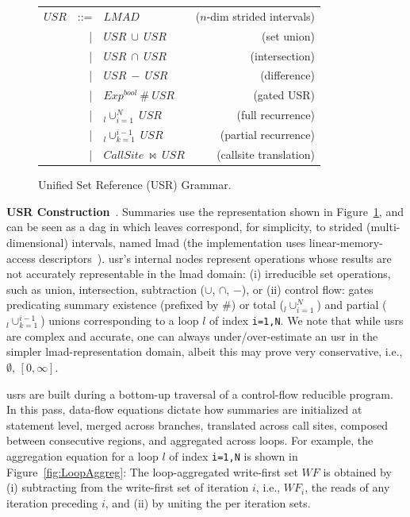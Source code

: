 \documentclass{sig-alternate}
\begin{document}
\begin{figure}[hbt]
\begin{tabular}{lclr}
$USR$ & ::= &  $LMAD$                 & ($n$-dim strided intervals)\\
      & {\tt~~}| & $USR \ \cup \ USR$ & (set union)\\
      & {\tt~~}| & $USR \ \cap \ USR$ & (intersection)\\
      & {\tt~~}| & $USR \ - \ USR$ & (difference)\\
      & {\tt~~}| & $Exp^{bool} \ \# \ USR$ & (gated USR)\\
      & {\tt~~}| & $_l\cup_{i=1}^{N} \ USR$ & (full recurrence)\\
      & {\tt~~}| & $_l\cup_{k=1}^{i-1} \ USR$ & (partial recurrence)\\
      & {\tt~~}| & $CallSite \ \bowtie \ USR$ & (callsite translation)
\end{tabular}\vspace{-2ex}
\caption{Unified Set Reference (USR) Grammar.}
\label{fig:USRgrammar}
\end{figure}

{\bf USR Construction}~\cite{HybAn}.
%
Summaries use the representation shown in Figure~\ref{fig:USRgrammar},
and can be seen as a {\sc dag} in which leaves correspond,
for simplicity, to strided (multi-dimensional) intervals, 
named {\sc lmad} (the implementation uses linear-memory-access 
descriptors~\cite{LMAD}).
{\sc usr}'s internal nodes represent operations whose results are not
accurately representable in the {\sc lmad} domain: (i) irreducible set
operations, such as union, intersection, subtraction ($\cup$, $\cap$, $-$), 
or (ii) control flow: gates predicating
summary existence (prefixed by $\#$) or total ($_l\cup_{i=1}^N$) and partial 
($_l\cup_{k=1}^{i-1}$) unions corresponding to a loop $l$ of
index {\tt i=1,N}. 
%
We note that while {\sc usr}s are complex and accurate,
one can always under/over-estimate an {\sc usr} in the 
simpler {\sc lmad}-representation domain, albeit this may 
prove very conservative, i.e., $\emptyset$, $[0,\infty]$. 


{\sc usr}s are built during a bottom-up traversal of a control-flow 
reducible program.
%
In this pass, data-flow equations dictate how summaries 
are initialized at statement level, merged across branches, 
translated across call sites, composed between consecutive 
regions, and aggregated across loops. 
%
For example, the aggregation equation for a loop $l$ of index 
{\tt i=1,N} is shown in Figure~\ref{fig:LoopAggreg}:
The loop-aggregated write-first set $WF$ is obtained 
by (i) subtracting from the write-first set of iteration 
$i$, i.e., $WF_i$, the reads of any iteration preceding $i$,
and (ii) by uniting the per iteration sets. %
\end{document}
